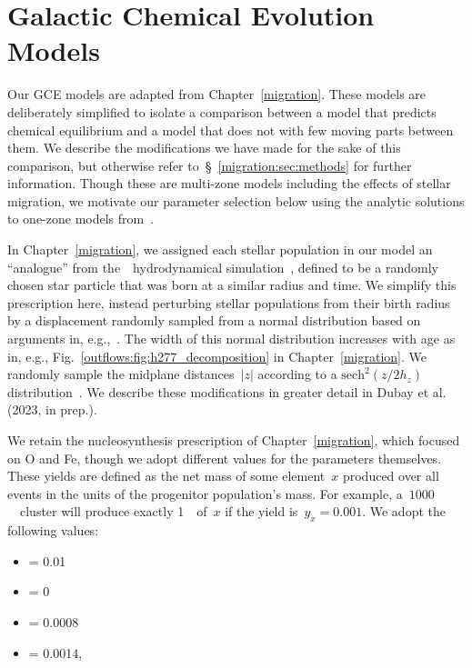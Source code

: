 
\section{Galactic Chemical Evolution Models}
\label{outflows:sec:gce}

Our GCE models are adapted from Chapter~\ref{migration}.
These models are deliberately simplified to isolate a comparison between a
model that predicts chemical equilibrium and a model that does not with few
moving parts between them.
We describe the modifications we have made for the sake of this comparison, but
otherwise refer to~\S~\ref{migration:sec:methods} for further information.
Though these are multi-zone models including the effects of stellar migration,
we motivate our parameter selection below using the analytic solutions to
one-zone models from~\citet{Weinberg2017b}.
\par
In Chapter~\ref{migration}, we assigned each stellar population in our model an
``analogue'' from the~\hsim~hydrodynamical simulation~\citep{Christensen2012,
Loebman2012, Loebman2014, Zolotov2012, Brooks2014}, defined to be a randomly
chosen star particle that was born at a similar radius and time.
We simplify this prescription here, instead perturbing stellar populations from
their birth radius by a displacement randomly sampled from a normal
distribution based on arguments in, e.g.,~\citet{Frankel2018}.
The width of this normal distribution increases with age as in, e.g.,
Fig.~\ref{outflows:fig:h277_decomposition} in Chapter~\ref{migration}.
We randomly sample the midplane distances~$\left|z\right|$ according to a
$\text{sech}^2(z / 2h_z)$ distribution~\citep{Binney1987}.
We describe these modifications in greater detail in Dubay et al. (2023, in
prep.).
\par
We retain the nucleosynthesis prescription of Chapter~\ref{migration}, which
focused on O and Fe, though we adopt different values for the parameters
themselves.
These yields are defined as the net mass of some element~$x$ produced over all
events in the units of the progenitor population's mass.
For example, a~$1000$~\msun~cluster will produce exactly 1~\msun~of~$x$ if
the yield is~$y_x = 0.001$.
We adopt the following values:
\begin{itemize}

	\item {} = 0.01

	\item {} = 0

	\item {} = 0.0008

	\item {} = 0.0014,

\end{itemize}
